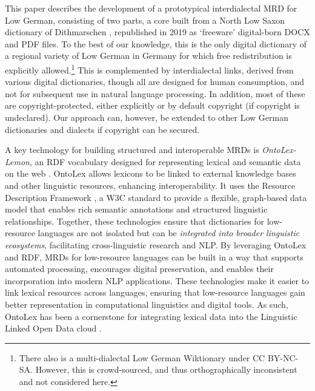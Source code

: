 This paper describes the development of a prototypical interdialectal MRD for Low German, consisting of two parts, a core built from a North Low Saxon dictionary of Dithmarschen \cite[further WöWö]{neuber-2001-woerner-woer}, republished in 2019 as  `freeware' digital-born DOCX and PDF files. To the best of our knowledge, this is the only digital dictionary of a regional variety of Low German in Germany for which free redistribution is explicitly allowed.\footnote{
    There also is a multi-dialectal Low German Wiktionary under CC BY-NC-SA. However, this is crowd-sourced, and thus orthographically inconsistent and not considered here. 
}
This is complemented by interdialectal links, derived from various digital dictionaries, though all are designed for human consumption, and not for subsequent use in natural language processing. In addition, most of these are copyright-protected, either explicitly or by default copyright (if copyright is undeclared). Our approach can, however, be extended to other Low German dictionaries and dialects if copyright can be secured.
    
A key technology for building structured and interoperable MRDs is \emph{OntoLex-Lemon}, an RDF vocabulary  designed for representing lexical and semantic data on the web \cite{mccrae2017ontolex}. OntoLex allows lexicons to be linked to external knowledge bases and other linguistic resources, enhancing interoperability. It uses the Resource Description Framework \cite[RDF]{beckett2014rdf}, a W3C standard to provide a flexible, graph-based data model that enables rich semantic annotations and structured linguistic relationships. Together, these technologies ensure that dictionaries for low-resource languages are not isolated but can be \emph{integrated into broader linguistic ecosystems}, facilitating cross-linguistic research and NLP. By leveraging OntoLex and RDF, MRDs for low-resource languages can be built in a way that supports automated processing, encourages digital preservation, and enables their incorporation into modern NLP applications. 
These technologies make it easier to link lexical resources across languages, ensuring that low-resource languages gain better representation in computational linguistics and digital tools. As such, OntoLex has been a cornerstone for integrating lexical data into the Linguistic Linked Open Data cloud \cite{declerck2018towards}. 


